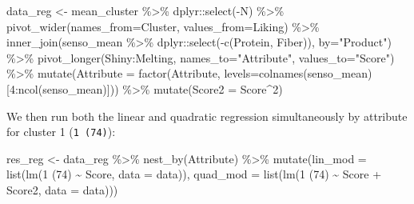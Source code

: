 \documentclass[
]{book}
\newenvironment{Shaded}{\begin{snugshade}}{\end{snugshade}}
\newcommand{\AttributeTok}[1]{\textcolor[rgb]{0.77,0.63,0.00}{#1}}
\newcommand{\DecValTok}[1]{\textcolor[rgb]{0.00,0.00,0.81}{#1}}
\newcommand{\FunctionTok}[1]{\textcolor[rgb]{0.00,0.00,0.00}{#1}}
\newcommand{\NormalTok}[1]{#1}
\newcommand{\OtherTok}[1]{\textcolor[rgb]{0.56,0.35,0.01}{#1}}
\newcommand{\SpecialCharTok}[1]{\textcolor[rgb]{0.00,0.00,0.00}{#1}}
\newcommand{\StringTok}[1]{\textcolor[rgb]{0.31,0.60,0.02}{#1}}
\begin{document}
\begin{Shaded}
\begin{Highlighting}[]
\NormalTok{data\_reg }\OtherTok{\textless{}{-}}\NormalTok{ mean\_cluster }\SpecialCharTok{\%\textgreater{}\%} 
\NormalTok{  dplyr}\SpecialCharTok{::}\FunctionTok{select}\NormalTok{(}\SpecialCharTok{{-}}\NormalTok{N) }\SpecialCharTok{\%\textgreater{}\%} 
  \FunctionTok{pivot\_wider}\NormalTok{(}\AttributeTok{names\_from=}\NormalTok{Cluster, }\AttributeTok{values\_from=}\NormalTok{Liking) }\SpecialCharTok{\%\textgreater{}\%} 
  \FunctionTok{inner\_join}\NormalTok{(senso\_mean }\SpecialCharTok{\%\textgreater{}\%}\NormalTok{ dplyr}\SpecialCharTok{::}\FunctionTok{select}\NormalTok{(}\SpecialCharTok{{-}}\FunctionTok{c}\NormalTok{(Protein, Fiber)), }\AttributeTok{by=}\StringTok{"Product"}\NormalTok{) }\SpecialCharTok{\%\textgreater{}\%} 
  \FunctionTok{pivot\_longer}\NormalTok{(Shiny}\SpecialCharTok{:}\NormalTok{Melting, }\AttributeTok{names\_to=}\StringTok{"Attribute"}\NormalTok{, }\AttributeTok{values\_to=}\StringTok{"Score"}\NormalTok{) }\SpecialCharTok{\%\textgreater{}\%} 
  \FunctionTok{mutate}\NormalTok{(}\AttributeTok{Attribute =} \FunctionTok{factor}\NormalTok{(Attribute, }\AttributeTok{levels=}\FunctionTok{colnames}\NormalTok{(senso\_mean)[}\DecValTok{4}\SpecialCharTok{:}\FunctionTok{ncol}\NormalTok{(senso\_mean)])) }\SpecialCharTok{\%\textgreater{}\%} 
  \FunctionTok{mutate}\NormalTok{(}\AttributeTok{Score2 =}\NormalTok{ Score}\SpecialCharTok{\^{}}\DecValTok{2}\NormalTok{)}
\end{Highlighting}
\end{Shaded}

We then run both the linear and quadratic regression simultaneously by attribute for cluster 1 (\texttt{1\ (74)}):

\begin{Shaded}
\begin{Highlighting}[]
\NormalTok{res\_reg }\OtherTok{\textless{}{-}}\NormalTok{ data\_reg }\SpecialCharTok{\%\textgreater{}\%} 
  \FunctionTok{nest\_by}\NormalTok{(Attribute) }\SpecialCharTok{\%\textgreater{}\%} 
  \FunctionTok{mutate}\NormalTok{(}\AttributeTok{lin\_mod =} \FunctionTok{list}\NormalTok{(}\FunctionTok{lm}\NormalTok{(}\StringTok{\textasciigrave{}}\AttributeTok{1 (74)}\StringTok{\textasciigrave{}} \SpecialCharTok{\textasciitilde{}}\NormalTok{ Score, }\AttributeTok{data =}\NormalTok{ data)), }
         \AttributeTok{quad\_mod =} \FunctionTok{list}\NormalTok{(}\FunctionTok{lm}\NormalTok{(}\StringTok{\textasciigrave{}}\AttributeTok{1 (74)}\StringTok{\textasciigrave{}} \SpecialCharTok{\textasciitilde{}}\NormalTok{ Score }\SpecialCharTok{+}\NormalTok{ Score2, }\AttributeTok{data =}\NormalTok{ data)))}
\end{Highlighting}
\end{Shaded}
\end{document}
